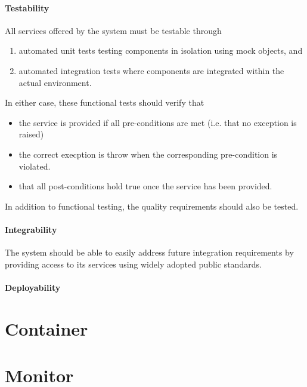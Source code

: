 \paragraph{Testability}
All services offered by the system must be testable through
\begin{enumerate}
	\item automated unit tests testing components in isolation using mock objects, and
	\item automated integration tests where components are integrated within the actual environment.
\end{enumerate}

In either case, these functional tests should verify that
\begin{itemize}
	\item the service is provided if all pre-conditions are met (i.e. that no exception is raised)
	\item the correct execption is throw when the corresponding pre-condition
	is violated.
	\item that all post-conditions hold true once the service has been provided.
\end{itemize}

In addition to functional testing, the quality requirements should also be tested.

\paragraph{Integrability}
The system should be able to easily address future integration requirements
by providing access to its services using widely adopted public standards.

\paragraph{Deployability}
\label{sec:systemDeployability}

\section{Container}


\section{Monitor}


